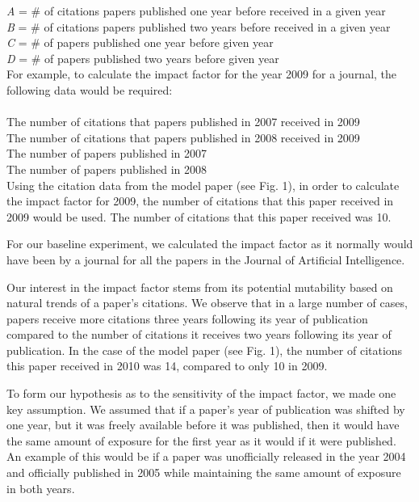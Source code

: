 \documentclass[times]{jtitauth}
\begin{document}
\textit{A} = \# of citations papers published one year before received in a given year
\\ \textit{B} = \# of citations papers published two years before received in a given year
\\ \textit{C} = \# of papers published one year before given year 
\\ \textit{D} = \# of papers published two years before given year \\ 

For example, to calculate the impact factor for the year 2009 for a journal, the following data would be required:
\\
\\The number of citations that papers published in 2007 received in 2009 
\\The number of citations that papers published in 2008 received in 2009 
\\The number of papers published in 2007
\\The number of papers published in 2008 \\

Using the citation data from the model paper (see Fig. 1), in order to calculate the impact factor for 2009, the number of citations that this paper received in 2009 would be used. The number of citations that this paper received was 10. 

For our baseline experiment, we calculated the impact factor as it normally would have been by a journal for all the papers in the Journal of Artificial Intelligence. 

Our interest in the impact factor stems from its potential mutability based on natural trends of a paper's citations. We observe that in a large number of cases, papers receive more citations three years following its year of publication compared to the number of citations it receives two years following its year of publication. In the case of the model paper (see Fig. 1), the number of citations this paper received in 2010 was 14, compared to only 10 in 2009. 

To form our hypothesis as to the sensitivity of the impact factor, we made one key assumption. We assumed that if a paper's year of publication was shifted by one year, but it was freely available before it was published, then it would have the same amount of exposure for the first year as it would if it were published. An example of this would be if a paper was unofficially released in the year 2004 and officially published in 2005 while maintaining the same amount of exposure in both years. 
\end{document}
